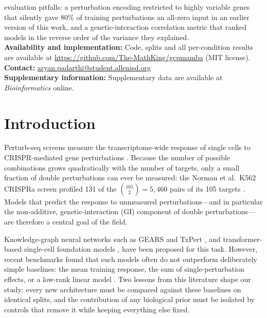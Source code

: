 \documentclass{bioinfo}
\begin{document}
{evaluation pitfalls: a perturbation encoding restricted to highly variable genes that silently
gave 80\% of training perturbations an all-zero input in an earlier version of this work, and a
genetic-interaction correlation metric that ranked models in the reverse order of the variance
they explained.\\
\textbf{Availability and implementation:} Code, splits and all per-condition results are
available at \url{https://github.com/The-MathKing/gcpmamba} (MIT license).\\
\textbf{Contact:} \href{mailto:aryan.padarthi@student.allenisd.org}{aryan.padarthi@student.allenisd.org}\\
\textbf{Supplementary information:} Supplementary data are available at \textit{Bioinformatics}
online.}

\maketitle

\section{Introduction}

Perturb-seq screens measure the transcriptome-wide response of single cells to CRISPR-mediated
gene perturbations \citep{dixit2016,norman2019,replogle2022}. Because the number of possible
combinations grows quadratically with the number of targets, only a small fraction of double
perturbations can ever be measured: the Norman et al.\ K562 CRISPRa screen profiled 131 of the
$\binom{105}{2}=5{,}460$ pairs of its 105 targets \citep{norman2019}. Models that predict the
response to unmeasured perturbations---and in particular the non-additive, genetic-interaction
(GI) component of double perturbations---are therefore a central goal of the field.

Knowledge-graph neural networks such as GEARS \citep{roohani2024} and TxPert \citep{wenkel2026},
and transformer-based single-cell foundation models \citep{cui2024scgpt,theodoris2023}, have been
proposed for this task. However, recent benchmarks found that such models often do not outperform
deliberately simple baselines: the mean training response, the sum of single-perturbation effects,
or a low-rank linear model \citep{ahlmann2025,csendes2025}. Two lessons from this literature shape
our study: every new architecture must be compared against these baselines on identical splits, and
the contribution of any biological prior must be isolated by controls that remove it while keeping
everything else fixed.
\end{document}
